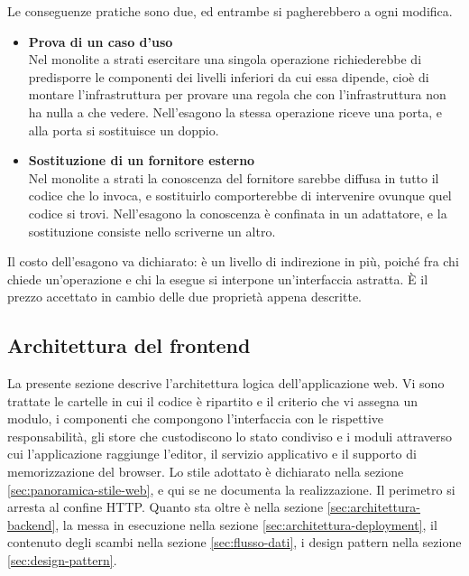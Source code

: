 \documentclass[a4paper, 10pt]{article}
\begin{document}
Le conseguenze pratiche sono due, ed entrambe si pagherebbero a ogni modifica.

\begin{itemize}
    \setlength{\itemsep}{2pt}
    \item \textbf{Prova di un caso d'uso}\\
    Nel monolite a strati esercitare una singola operazione richiederebbe di predisporre le componenti dei livelli inferiori da cui essa dipende, cioè di montare l'infrastruttura per provare una regola che con l'infrastruttura non ha nulla a che vedere. Nell'esagono la stessa operazione riceve una porta, e alla porta si sostituisce un doppio.
    \item \textbf{Sostituzione di un fornitore esterno}\\
    Nel monolite a strati la conoscenza del fornitore sarebbe diffusa in tutto il codice che lo invoca, e sostituirlo comporterebbe di intervenire ovunque quel codice si trovi. Nell'esagono la conoscenza è confinata in un adattatore, e la sostituzione consiste nello scriverne un altro.
\end{itemize}

\noindent Il costo dell'esagono va dichiarato: è un livello di indirezione in più, poiché fra chi chiede un'operazione e chi la esegue si interpone un'interfaccia astratta. È il prezzo accettato in cambio delle due proprietà appena descritte.


\subsection{Architettura del frontend}
\label{sec:architettura-frontend}

La presente sezione descrive l'architettura logica dell'applicazione web. Vi sono trattate le cartelle in cui il codice è ripartito e il criterio che vi assegna un modulo, i componenti che compongono l'interfaccia con le rispettive responsabilità, gli store che custodiscono lo stato condiviso e i moduli attraverso cui l'applicazione raggiunge l'editor, il servizio applicativo e il supporto di memorizzazione del browser. Lo stile adottato è dichiarato nella sezione \ref{sec:panoramica-stile-web}, e qui se ne documenta la realizzazione. Il perimetro si arresta al confine HTTP. Quanto sta oltre è nella sezione \ref{sec:architettura-backend}, la messa in esecuzione nella sezione \ref{sec:architettura-deployment}, il contenuto degli scambi nella sezione \ref{sec:flusso-dati}, i design pattern nella sezione \ref{sec:design-pattern}.
\end{document}
